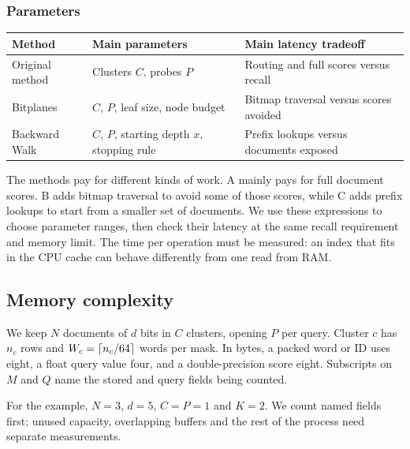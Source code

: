 \subsubsection{Parameters}
\begin{center}\small
\begin{tabularx}{\linewidth}{@{}lYY@{}}\toprule
Method & Main parameters & Main latency tradeoff\\\midrule
Original method & Clusters $C$, probes $P$ & Routing and full scores versus recall\\
Bitplanes & $C$, $P$, leaf size, node budget & Bitmap traversal versus scores avoided\\
Backward Walk & $C$, $P$, starting depth $x$, stopping rule & Prefix lookups versus documents exposed\\\bottomrule
\end{tabularx}
\end{center}
The methods pay for different kinds of work. A mainly pays for full document scores. B adds bitmap traversal to avoid some of those scores, while C adds prefix lookups to start from a smaller set of documents. We use these expressions to choose parameter ranges, then check their latency at the same recall requirement and memory limit. The time per operation must be measured: an index that fits in the CPU cache can behave differently from one read from RAM.

\subsection{Memory complexity}
We keep $N$ documents of $d$ bits in $C$ clusters, opening $P$ per query. Cluster $c$ has $n_c$ rows and $W_c=\left\lceil n_c/64\right\rceil$ words per mask. In bytes, a packed word or ID uses eight, a float query value four, and a double-precision score eight. Subscripts on $M$ and $Q$ name the stored and query fields being counted.

For the example, $N=3$, $d=5$, $C=P=1$ and $K=2$. We count named fields first; unused capacity, overlapping buffers and the rest of the process need separate measurements.


